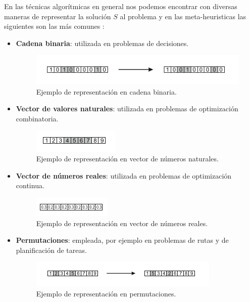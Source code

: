 En las técnicas algorítmicas en general nos podemos encontrar con diversas maneras de representar la solución $S$ al problema y en las meta-heuristicas las siguientes son las más comunes \cite{metaheuristics}:

\bigskip

\begin{itemize}
    \item \textbf{Cadena binaria}: utilizada en problemas de decisiones.
    \begin{figure}[!ht]
    \centering
    \includegraphics[scale=1.2]{images/binaria}
    \caption{Ejemplo de representación en cadena binaria.}
    \end{figure} 
    \item \textbf{Vector de valores naturales}: utilizada en problemas de optimización combinatoria.
    \begin{figure}[!ht]
    \centering
    \includegraphics[scale=1.2]{images/natural}
    \caption{Ejemplo de representación en vector de números naturales.}
    \end{figure}
    \item \textbf{Vector de números reales}: utilizada en problemas de optimización continua.
    \begin{figure}[!ht]
    \centering
    \includegraphics[scale=1.2]{images/reales}
    \caption{Ejemplo de representación en vector de números reales.}
    \end{figure}
    \item \textbf{Permutaciones}: empleada, por ejemplo en problemas de rutas y de planificación de tareas.
    \begin{figure}[!ht]
    \centering
    \includegraphics[scale=1.2]{images/secuencia}
    \caption{Ejemplo de representación en permutaciones.}
    \end{figure}
\end{itemize}

